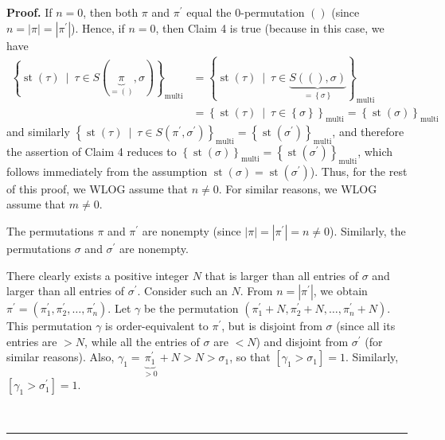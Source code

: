 \documentclass[numbers=enddot,12pt,final,onecolumn,notitlepage]{scrartcl}%
\theoremstyle{definition}
\newenvironment{proof}[1][Proof]{\noindent\textbf{#1.} }{\ \rule{0.5em}{0.5em}}
\newenvironment{verlong}{}{}
\begin{document}
\begin{verlong}
\begin{proof}
If $n=0$, then both $\pi$ and $\pi^{\prime}$ equal the $0$-permutation
$\left(  {}\right)  $ (since $n=\left\vert \pi\right\vert =\left\vert
\pi^{\prime}\right\vert $). Hence, if $n=0$, then Claim 4 is true (because in
this case, we have%
\begin{align*}
\left\{  \operatorname*{st}\left(  \tau\right)  \ \mid\ \tau\in S\left(
\underbrace{\pi}_{=\left(  {}\right)  },\sigma\right)  \right\}
_{\operatorname*{multi}}  &  =\left\{  \operatorname*{st}\left(  \tau\right)
\ \mid\ \tau\in\underbrace{S\left(  \left(  {}\right)  ,\sigma\right)
}_{=\left\{  \sigma\right\}  }\right\}  _{\operatorname*{multi}}\\
&  =\left\{  \operatorname*{st}\left(  \tau\right)  \ \mid\ \tau\in\left\{
\sigma\right\}  \right\}  _{\operatorname*{multi}}=\left\{  \operatorname*{st}%
\left(  \sigma\right)  \right\}  _{\operatorname*{multi}}%
\end{align*}
and similarly $\left\{  \operatorname*{st}\left(  \tau\right)  \ \mid\ \tau\in
S\left(  \pi^{\prime},\sigma^{\prime}\right)  \right\}
_{\operatorname*{multi}}=\left\{  \operatorname*{st}\left(  \sigma^{\prime
}\right)  \right\}  _{\operatorname*{multi}}$, and therefore the assertion of
Claim 4 reduces to $\left\{  \operatorname*{st}\left(  \sigma\right)
\right\}  _{\operatorname*{multi}}=\left\{  \operatorname*{st}\left(
\sigma^{\prime}\right)  \right\}  _{\operatorname*{multi}}$, which follows
immediately from the assumption $\operatorname*{st}\left(  \sigma\right)
=\operatorname*{st}\left(  \sigma^{\prime}\right)  $). Thus, for the rest of
this proof, we WLOG assume that $n\neq0$. For similar reasons, we WLOG assume
that $m\neq0$.

The permutations $\pi$ and $\pi^{\prime}$ are nonempty (since $\left\vert
\pi\right\vert =\left\vert \pi^{\prime}\right\vert =n\neq0$). Similarly, the
permutations $\sigma$ and $\sigma^{\prime}$ are nonempty.

There clearly exists a positive integer $N$ that is larger than all entries of
$\sigma$ and larger than all entries of $\sigma^{\prime}$. Consider such an
$N$. From $n=\left\vert \pi^{\prime}\right\vert $, we obtain $\pi^{\prime
}=\left(  \pi_{1}^{\prime},\pi_{2}^{\prime},\ldots,\pi_{n}^{\prime}\right)  $.
Let $\gamma$ be the permutation $\left(  \pi_{1}^{\prime}+N,\pi_{2}^{\prime
}+N,\ldots,\pi_{n}^{\prime}+N\right)  $. This permutation $\gamma$ is
order-equivalent to $\pi^{\prime}$, but is disjoint from $\sigma$ (since all
its entries are $>N$, while all the entries of $\sigma$ are $<N$) and disjoint
from $\sigma^{\prime}$ (for similar reasons). Also, $\gamma_{1}%
=\underbrace{\pi_{1}^{\prime}}_{>0}+N>N>\sigma_{1}$, so that $\left[
\gamma_{1}>\sigma_{1}\right]  =1$. Similarly, $\left[  \gamma_{1}>\sigma
_{1}^{\prime}\right]  =1$.


\end{proof}
\end{verlong}
\end{document}
